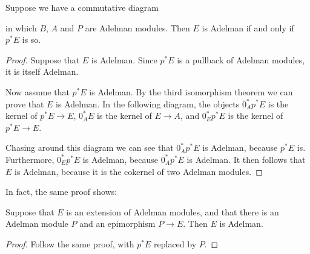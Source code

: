\begin{lemma}
  \label{adelman-ext-pb-red}
  Suppose we have a commutative diagram
  \begin{center}
  \end{center}
  in which $B$, $A$ and $P$ are Adelman modules.
  Then $E$ is Adelman if and only if $p^*E$ is so.
\end{lemma}

\begin{proof}
  Suppose that $E$ is Adelman.
  Since $p^*E$ is a pullback of Adelman modules, it is itself Adelman.

  Now assume that $p^*E$ is Adelman.
  By the third isomorphism theorem we can prove that $E$ is Adelman.
  In the following diagram, the objects $0^*_Ap^*E$ is the kernel of $p^*E \rightarrow E$, $0^*_AE$ is the kernel of $E \rightarrow A$, and $0^*_Ep^*E$ is the kernel of $p^*E \rightarrow E$.
  \begin{center}
  \end{center}
  Chasing around this diagram we can see that $0^*_Ap^*E$ is Adelman, because $p^*E$ is.
  Furthermore, $0^*_Ep^*E$ is Adelman, because $0^*_Ap^*E$ is Adelman.
  It then follows that $E$ is Adelman, because it is the cokernel of two Adelman modules.
\end{proof}

In fact, the same proof shows:

\begin{lemma}
  \label{adelman-ext-quotient-adelman}
  Suppose that $E$ is an extension of Adelman modules, and that there is an
  Adelman module $P$ and an epimorphism $P \to E$.  Then $E$ is Adelman.
\end{lemma}

\begin{proof}
Follow the same proof, with $p^*E$ replaced by $P$.
\end{proof}


